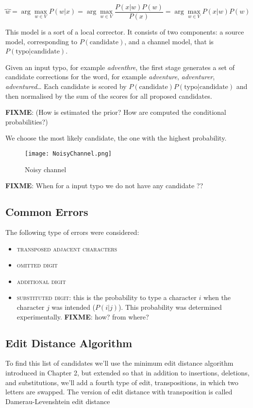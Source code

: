 \[\overbrace{w} = \arg\max_{w \in V} P(w|x) = \arg\max_{w \in V} \frac{P(x|w)P(w)}{P(x)} = \arg\max_{w \in V} 
{P(x|w)P(w)}\]


This model is a sort of a local corrector. It consists of two components: a source model, corresponding to 
$P(\text{candidate})$, and a channel model, 
that is $P(\text{typo}|\text{candidate})$.


Given an input typo, for example \textsl{adventhre}, the first stage generates a set of candidate corrections for the word, 
for example \textsl{adventure}, \textsl{adventurer}, \textsl{adventured}…
Each candidate is scored by $P(\text{candidate})P(\text{typo}|\text{candidate})$ and then normalised by the sum of the 
scores for all proposed candidates.

\textbf{FIXME}:  (How is estimated the prior? How are computed the conditional probabilities?)

We choose the most likely candidate, the one with the highest probability.

\begin{figure}[H]
	\centering
	\texttt{[image: NoisyChannel.png]}
	\caption{Noisy channel}
	\label{fig:noisychannel}
\end{figure}

\textbf{FIXME}: When for a input typo we do not have any candidate ?? 


\subsection{Common Errors}
The following type of errors were considered:
\begin{itemize}
	\item \textsc{transposed adjacent characters}
	\item \textsc{omitted digit}
	\item \textsc{additional digit}
	\item \textsc{substituted digit}: this is the probability to type a
	character $i$ when the character $j$ was intended ($P(i|j)$). This 
	probability was determined experimentally. \textbf{FIXME}: how? from where?
\end{itemize}

\subsection{Edit Distance Algorithm}
To find this list of candidates we’ll use the minimum edit distance algorithm introduced in Chapter 2, but extended so that 
in addition to insertions, deletions, and substitutions, we’ll add a fourth type of edit, transpositions, in which two letters 
are swapped.
The version of edit distance with transposition is called Damerau-Levenshtein edit distance


